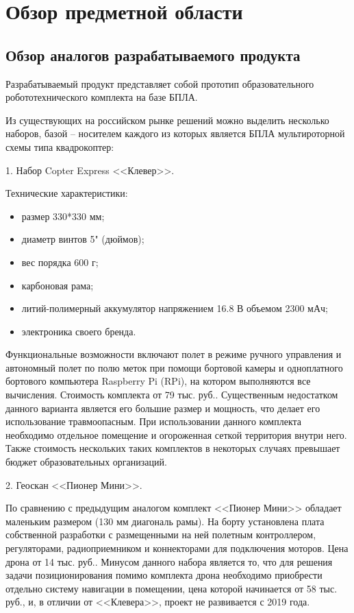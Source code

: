 
\section{Обзор предметной области}

\subsection{Обзор аналогов разрабатываемого продукта}
Разрабатываемый продукт представляет собой прототип образовательного робототехнического комплекта на базе БПЛА.

Из существующих на российском рынке решений можно выделить нес\-колько наборов, базой -- носителем каждого из которых является БПЛА мультироторной схемы типа квадрокоптер:

1. Набор Copter Express <<Клевер>>.

Технические характеристики:
\begin{itemize}
	\item размер 330*330 мм;
	\item диаметр винтов 5" (дюймов);
	\item вес порядка 600 г;
	\item карбоновая рама;
	\item литий-полимерный аккумулятор напряжением 16.8 В объемом 2300 мАч;
	\item электроника своего бренда.
\end{itemize}

Функциональные возможности включают полет в режиме ручного управления и автономный полет по полю меток при помощи бортовой камеры и одноплатного бортового компьютера Raspberry Pi (RPi), на котором выполняются все вычисления. Стоимость комплекта от 79 тыс. руб.. Существенным недостатком данного варианта является его большие размер и мощность, что делает его использование травмоопасным. При использовании данного комплекта необходимо отдельное помещение и огороженная сеткой территория внутри него. Также стоимость нескольких таких комплектов в некоторых случаях превышает бюджет образовательных организаций.

2. Геоскан <<Пионер Мини>>.

По сравнению с предыдущим аналогом комплект <<Пионер Мини>> обладает маленьким размером (130 мм диагональ рамы). На борту установлена плата собственной разработки с размещенными на ней полетным контроллером, регуляторами, радиоприемником и коннекторами для подключения моторов. Цена дрона от 14 тыс. руб.. Минусом данного набора является то, что для решения задачи позиционирования помимо комплекта дрона необходимо приобрести отдельно систему навигации в помещении, цена которой начинается от 58 тыс. руб., и, в отличии от <<Клевера>>, проект не развивается с 2019 года.

